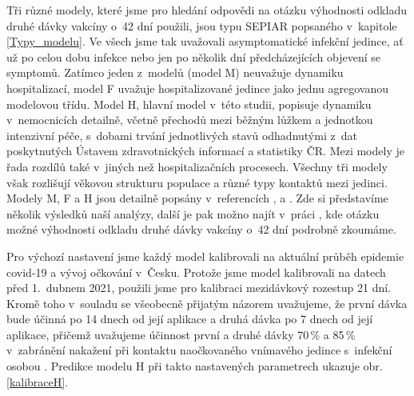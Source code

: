 Tři různé modely, které jsme pro hledání odpovědi na otázku výhodnosti odkladu druhé dávky vakcíny o~42 dní použili, jsou typu SEPIAR popsaného v~kapitole \ref{Typy_modelu}. Ve všech jsme tak uvažovali asymptomatické infekční jedince, ať už po celou dobu infekce nebo jen po několik dní předcházejících objevení se symptomů. Zatímco jeden z~modelů (model M) neuvažuje dynamiku hospitalizací, model F uvažuje hospitalizované jedince jako jednu agregovanou modelovou třídu. Model H, hlavní model v~této studii, popisuje dynamiku v~nemocnicích detailně, včetně přechodů mezi běžným lůžkem a jednotkou intenzivní péče, s~dobami trvání jednotlivých stavů odhadnutými z~dat poskytnutých Ústavem zdravotnických informací a statistiky ČR. Mezi modely je řada rozdílů také v~jiných než hospitalizačních procesech. Všechny tři modely však rozlišují věkovou strukturu populace a různé typy kontaktů mezi jedinci. Modely M, F a H jsou detailně popsány v~referencích \cite{M-techrep2021}, \cite{Smid2021seir} a \cite{vaccpaper}. Zde si představíme několik výsledků naší analýzy, další je pak možno najít v~práci \cite{vaccpaper}, kde otázku možné výhodnosti odkladu druhé dávky vakcíny o~42 dní podrobně zkoumáme. 

Pro výchozí nastavení jsme každý model kalibrovali na aktuální průběh epidemie covid-19 a vývoj očkování v~Česku. Protože jsme model kalibrovali na datech před 1.\ dubnem 2021, použili jsme pro kalibraci mezidávkový rozestup 21 dní. Kromě toho v~souladu se všeobecně přijatým názorem uvažujeme, že první dávka bude účinná po 14 dnech od její aplikace a druhá dávka po 7 dnech od její aplikace, přičemž uvažujeme účinnost první a druhé dávky 70\,\% a 85\,\% v~zabránění nakažení při kontaktu naočkovaného vnímavého jedince s~infekční osobou \cite{Hall_etal2021}. Predikce modelu H při takto nastavených parametrech ukazuje obr.\,\ref{kalibraceH}. 




